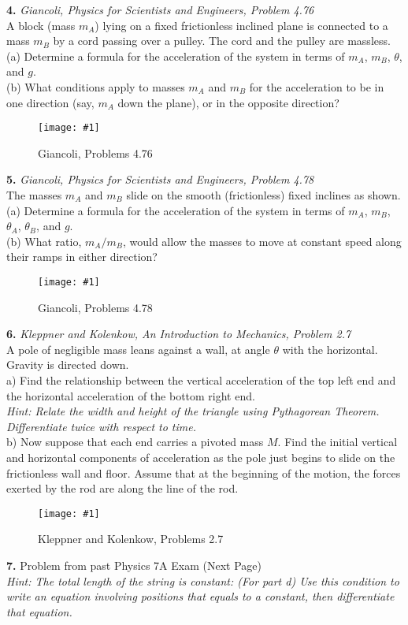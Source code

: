 \documentclass[11pt]{article}
\newcommand{\fig}[4]{
    \begin{figure}[H]
        \centering
        \texttt{[image: \#1]}
        \caption{#2}
        \label{exp4fit}
    \end{figure}
}
\theoremstyle{gangnamstyle}{\newtheorem{definition}{Definition}[]}
\theoremstyle{gangnamstyle}{\newtheorem{example}{Example}[]}
\theoremstyle{gangnamstyle}{\newtheorem{problem}{Problem}[]}
\begin{document}
\pagebreak

\textbf{4.} \textit{Giancoli, Physics for Scientists and Engineers, Problem 4.76} \\
A block (mass $m_A$) lying on a fixed frictionless inclined plane is connected to a mass $m_B$ by a cord passing over a pulley. The cord and the pulley are massless. \\
(a) Determine a formula for the acceleration of the system in terms of $m_A$, $m_B$, $\theta$, and $g$. \\
(b) What conditions apply to masses $m_A$ and $m_B$ for the acceleration to be in one direction (say, $m_A$ down the plane), or in the opposite direction? 
\fig{figs/0625/giancoli476.png}{Giancoli, Problems 4.76}{0.6}{0}

\pagebreak

\textbf{5.} \textit{Giancoli, Physics for Scientists and Engineers, Problem 4.78} \\
The masses $m_A$ and $m_B$ slide on the smooth (frictionless) fixed inclines as shown. \\
(a) Determine a formula for the acceleration of the system in terms of $m_A$, $m_B$, $\theta_A$, $\theta_B$, and $g$. \\
(b) What ratio, $m_A / m_B$, would allow the masses to move at constant speed along their ramps in either direction?
\fig{figs/0625/giancoli478.png}{Giancoli, Problems 4.78}{0.75}{0}

\pagebreak

\textbf{6.} \textit{Kleppner and Kolenkow, An Introduction to Mechanics, Problem 2.7} \\
A pole of negligible mass leans against a wall, at angle $\theta$ with the horizontal. Gravity is directed down. \\
a) Find the relationship between the vertical acceleration of the top left end and the horizontal acceleration of the bottom right end. \\
\textit{Hint: Relate the width and height of the triangle using Pythagorean Theorem. Differentiate twice with respect to time.} \\
b) Now suppose that each end carries a pivoted mass $M$. Find the initial vertical and horizontal components of acceleration as the pole just begins to slide on the frictionless wall and floor. Assume that at the beginning of the motion, the forces exerted by the rod are along the line of the rod.
\fig{figs/0625/kk27.png}{Kleppner and Kolenkow, Problems 2.7}{0.6}{0}

\vspace{3.25 in}
\textbf{7.} Problem from past Physics 7A Exam (Next Page) \\
\textit{Hint: The total length of the string is constant: (For part d) Use this condition to write an equation involving positions that equals to a constant, then differentiate that equation.}
\end{document}
